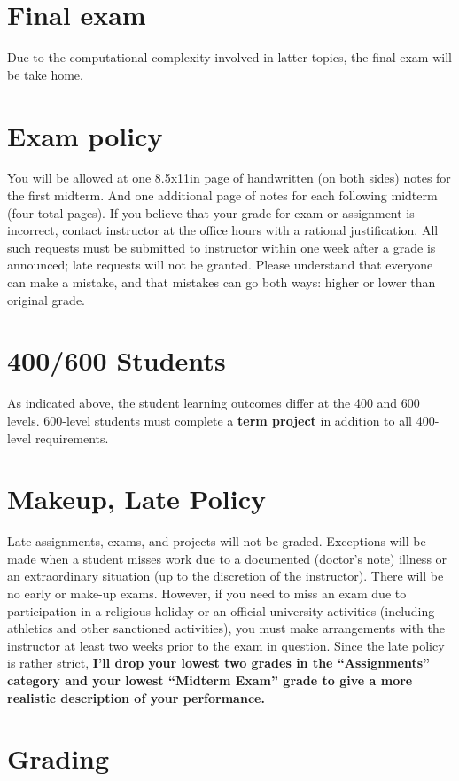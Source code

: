 \documentclass[11pt,onecolumn]{article}
\begin{document}
\section*{Final exam}
Due to the computational complexity involved in latter topics, the final exam will be take home.

\section*{Exam policy} You will be allowed at one 8.5x11in page of handwritten (on both sides) notes for the first midterm. And one additional page of notes for each following midterm (four total pages). If you believe that your grade for exam or assignment is incorrect, contact instructor at the office hours with a rational justification. All such requests must be submitted to instructor within one week after a grade is announced; late requests will not be granted. Please understand that everyone can make a mistake, and that mistakes can go both ways: higher or lower than original grade.

\section*{400/600 Students}
As indicated above, the student learning outcomes differ at the 400 and 600 levels. 600-level students must complete a \textbf{term project} in addition to all 400-level requirements.

\section*{Makeup, Late Policy}
Late assignments, exams, and projects will not be graded. Exceptions will be made when a student misses work due to a documented (doctor's note) illness or an extraordinary situation (up to the discretion of the instructor). There will be no early or make-up exams. However, if you need to miss an exam due to participation in a religious holiday or an official university activities (including athletics and other sanctioned activities), you must make arrangements with the instructor at least two weeks prior to the exam in question. Since the late policy is rather strict, \textbf{I'll drop your lowest two grades in the ``Assignments'' category and your lowest ``Midterm Exam'' grade to give a more realistic description of your performance.}

\clearpage
\section*{Grading}
\end{document}
